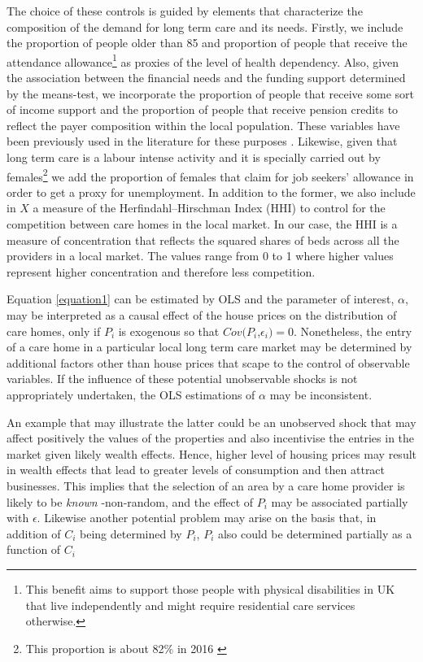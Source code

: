 \documentclass[12pt,letterpaper]{article}
\begin{document}
 The choice of these controls is guided by elements that characterize the composition of the demand 
for long term care and its needs. Firstly, we include the proportion 
  of people older than 85 and proportion of people that receive the attendance 
  allowance\footnote{This benefit aims to support those people with physical disabilities in UK that live
   independently and might require residential care services otherwise. } as proxies of the level 
   of health dependency. Also, given the association between the financial needs and the funding
    support determined by the means-test, we incorporate the proportion of people that receive some
     sort of income support and the proportion of people that receive pension credits to reflect the payer 
     composition within the local population. These variables have been previously used in the literature for these purposes 
     \citep{darton2010slicing, forder2014}. Likewise, given that long term care is a labour intense 
     activity and it is specially carried out by females\footnote{This proportion is about 82\% in 2016 \citep{workforce2016}}
      we add the proportion of females that claim for job seekers’ allowance in order to get a proxy for 
      unemployment. In addition to the former, we also include in $X$ a measure of the Herfindahl–Hirschman Index (HHI) to control for
      the competition between care homes in the local market. In our case, the HHI is a measure of concentration that 
      reflects the squared shares of beds across all the providers in a local market. The values range from
       0 to 1 where higher values represent higher concentration and therefore less competition.  
 
Equation \ref{equation1} can be estimated by OLS and the parameter of interest, $\alpha$,  may be interpreted as a causal effect
  of the house prices on the distribution of care homes, only if
         $P_i$ is exogenous so that $Cov(P_{i}$,$\epsilon_{i}) = 0 $. 
         Nonetheless, the entry of a care home in a particular local long term 
         care market may be determined by additional factors other than house 
         prices that scape to the control of observable variables. If the 
         influence of these potential unobservable shocks is not appropriately 
         undertaken, the OLS estimations of $\alpha$ may be inconsistent. 
         
  An example that may illustrate the latter could be an unobserved shock that may affect positively the values of the properties and also incentivise
   the entries in the market given likely wealth effects. Hence, higher level of housing prices may result in
    wealth effects that lead to greater levels of consumption and then attract businesses. This implies that the selection
     of an area by a care home provider is likely to be \textit{known} -non-random,  and the effect of $P_{i}$ may be associated partially 
     with $\epsilon$. Likewise another potential problem may arise on the basis 
     that, in addition of $C_{i}$ being determined by $P_{i}$, $P_{i}$ also could be determined partially as 
     a function of $C_{i}$
     
\end{document}
